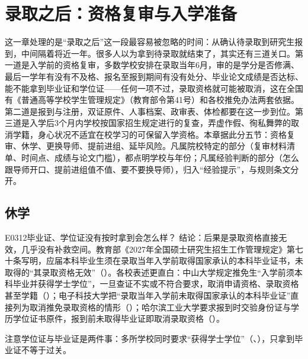 \chapter{录取之后：资格复审与入学准备}
\label{ch15}
\begin{keybox}
这一章处理的是“录取之后”这一段最容易被忽略的时间：从确认待录取到研究生报到，中间隔着将近一年。很多人以为拿到待录取就结束了，其实还有三道关口。第一道是入学前的资格复审，多数学校安排在录取当年6月，审的是学分是否修满、最后一学年有没有不及格、报名至报到期间有没有处分、毕业论文成绩是否达标、能不能拿到毕业证和学位证——任何一项不过，录取资格就可能被取消，这在全国有《普通高等学校学生管理规定》（教育部令第41号）和各校推免办法两套依据。第二道是报到与注册，双证原件、人事档案、政审表、体检都要在这一步到位。第三道是入学后3个月内学校按国家招生规定进行的复查，弄虚作假、徇私舞弊的取消学籍，身心状况不适宜在校学习的可保留入学资格。本章据此分五节：资格复审、休学、更换导师、提前进组、延毕风险。凡属院校特定的部分（复审材料清单、时间点、成绩与论文门槛），都点明学校与年份；凡属经验判断的部分（怎么跟导师开口、提前进组值不值、要不要换导师），归入“经验提示”，与规则条文分开。
\end{keybox}

\section{休学}
\begin{qa}{E0312}{毕业证、学位证没有按时拿到会怎么样？}
结论：后果是录取资格直接无效，几乎没有补救空间。教育部《2027年全国硕士研究生招生工作管理规定》第七十条写明，应届本科毕业生须在录取当年入学前取得国家承认的本科毕业证书，未取得的“其录取资格无效”（）。各校表述更直白：中山大学规定推免生“入学前须本科毕业并获得学士学位”，一旦查证不实或不符合要求，取消申请资格、录取资格甚至学籍（）；电子科技大学把“录取当年入学前未取得国家承认的本科毕业证”直接列为取消推免录取资格的情形（）；哈尔滨工业大学要求报到时交验身份证与学历学位证书原件，报到前未取得毕业证即取消录取资格（）。

注意学位证与毕业证是两件事：多所学校同时要求“获得学士学位”（、），只拿到毕业证不等于过关。
\end{qa}

